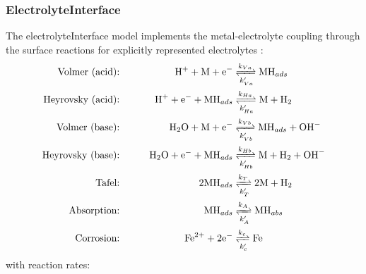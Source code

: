 \documentclass[3p]{elsarticle} %
\begin{document}
\subsubsection{ElectrolyteInterface}
The electrolyteInterface model implements the metal-electrolyte coupling through the surface reactions for explicitly represented electrolytes \citep{Liu2014, Hageman2022}:
\begin{alignat}{2}
 \text{Volmer (acid):} && \mathrm{H}^+ + \mathrm{M} + \mathrm{e}^- &\xrightleftharpoons[k_{Va}']{k_{Va}} \mathrm{MH}_{ads} \label{react:1} \\
  \text{Heyrovsky (acid):} && \qquad \mathrm{H}^+ + \mathrm{e}^- + \mathrm{MH}_{ads}&\xrightleftharpoons[k_{Ha}']{k_{Ha}} \mathrm{M} + \mathrm{H}_2 \label{react:2} \\
    \text{Volmer (base):} &&  \mathrm{H}_2\mathrm{O} + \mathrm{M} + \mathrm{e}^- &\xrightleftharpoons[k_{Vb}']{k_{Vb}} \mathrm{MH}_{ads} + \mathrm{OH}^- \label{react:5} \\
   \text{Heyrovsky (base):} && \qquad  \mathrm{H}_2\mathrm{O} + \mathrm{e}^- + \mathrm{MH}_{ads}&\xrightleftharpoons[k_{Hb}']{k_{Hb}} \mathrm{M} + \mathrm{H}_2 + \mathrm{OH}^- \label{react:6} \\
    \text{Tafel:} && 2 \mathrm{MH}_{ads} &\xrightleftharpoons[k_T']{k_T} 2\mathrm{M} + \mathrm{H}_2 \label{react:3} \\
   \text{Absorption:} && \mathrm{MH}_{ads} &\xrightleftharpoons[k_A']{k_A} \mathrm{MH}_{abs}  \label{react:4} \\
   \text{Corrosion:} && \qquad  \mathrm{Fe}^{2+}+2\mathrm{e}^- &\xrightleftharpoons[k_c']{k_c} \mathrm{Fe} \label{react:7}
\end{alignat}
with reaction rates:
\end{document}
